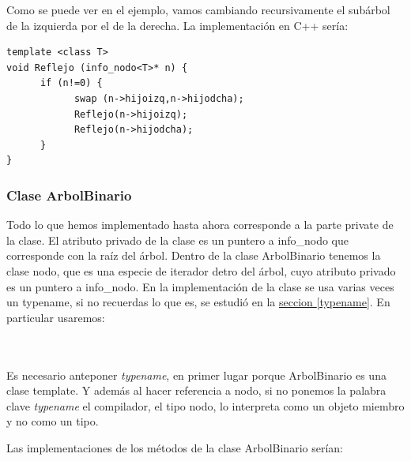 \documentclass[10pt,a4paper,spanish]{report}
\begin{document}
\noindent
Como se puede ver en el ejemplo, vamos cambiando recursivamente el subárbol de la izquierda por el de la derecha. La implementación en C++ sería:

\begin{verbatim}
template <class T>
void Reflejo (info_nodo<T>* n) {
      if (n!=0) {
            swap (n->hijoizq,n->hijodcha);
            Reflejo(n->hijoizq);
            Reflejo(n->hijodcha);
      }
}
\end{verbatim}

\subsubsection{\textcolor[rgb]{0.3,0.4,0.8}Clase ArbolBinario}
\noindent
Todo lo que hemos implementado hasta ahora corresponde a la parte private de la clase. El atributo privado de la clase es un puntero a info\_nodo que corresponde con la raíz del árbol. Dentro de la clase ArbolBinario tenemos la clase nodo, que es una especie de iterador detro del árbol, cuyo atributo privado es un puntero a info\_nodo.
En la implementación de la clase se usa varias veces un typename, si no recuerdas lo que es, se estudió en la \hyperref[typename]{seccion \ref*{typename}}. En particular usaremos: \\ 
 
 {\centering{}\par}\\ 

 \\Es necesario anteponer  {\it typename}, en primer lugar porque ArbolBinario es una clase template. Y 
además al hacer referencia a nodo, si no ponemos la palabra clave {\it typename} el compilador, el tipo nodo,  lo interpreta como un objeto miembro y no como un tipo.

Las implementaciones de los métodos de la clase ArbolBinario serían:
\end{document}
